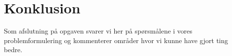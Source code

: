 \documentclass[11pt,a4paper,final]{article}
\begin{document}














\newpage
\section{Konklusion}
\label{sec:konklusion}
Som afslutning på opgaven svarer vi her på spørsmålene i vores problemformulering og kommenterer  områder hvor vi kunne have gjort ting bedre. 
\end{document}
